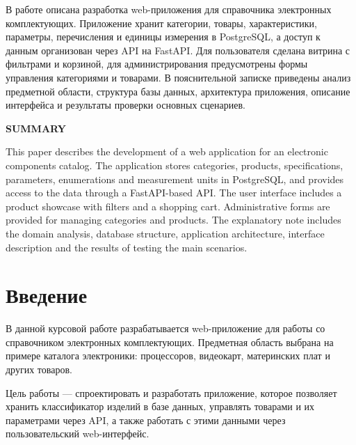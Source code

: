\documentclass[a4paper,14pt]{extarticle}
\begin{document}
В работе описана разработка web-приложения для справочника электронных комплектующих. Приложение хранит категории, товары, характеристики, параметры, перечисления и единицы измерения в PostgreSQL, а доступ к данным организован через API на FastAPI. Для пользователя сделана витрина с фильтрами и корзиной, для администрирования предусмотрены формы управления категориями и товарами. В пояснительной записке приведены анализ предметной области, структура базы данных, архитектура приложения, описание интерфейса и результаты проверки основных сценариев.

\vspace{1em}
\begin{center}
\textbf{SUMMARY}
\end{center}

This paper describes the development of a web application for an electronic components catalog.
The application stores categories, products, specifications, \\ parameters, enumerations and measurement units in PostgreSQL, and provides access to the data through a FastAPI-based API. The user interface includes a product showcase with filters and a shopping cart. Administrative forms are provided for managing categories and products. The explanatory note includes the domain analysis, database structure, application architecture, interface description and the results of testing the main scenarios.

\newpage
\tableofcontents

\newpage
\section{Введение}

В данной курсовой работе разрабатывается web-приложение для работы со справочником электронных комплектующих.
Предметная область выбрана на примере каталога электроники: процессоров, видеокарт, материнских плат и других товаров.

Цель работы --- спроектировать и разработать приложение, которое позволяет хранить классификатор изделий в базе данных, управлять товарами и их параметрами через API, а также работать с этими данными через пользовательский web-интерфейс.
\end{document}
